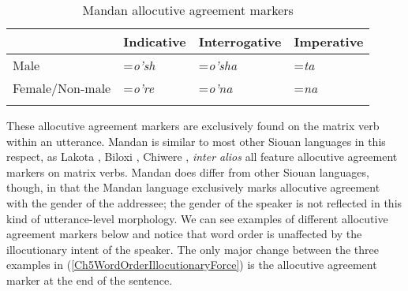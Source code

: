 \begin{table}
\caption{Mandan allocutive agreement markers} 
\label{allocutivetable2}

	\begin{tabular}{llll}
	\lsptoprule
		~		&
			Indicative		&
			Interrogative	&	
			Imperative\\
			\midrule
		Male	&	
			=\textit{o'sh}	&	
			=\textit{o'sha}	&	
			=\textit{ta}\\
		Female/Non-male	&	
			=\textit{o're}	&	
			=\textit{o'na}	&	
			=\textit{na}\\
			\lspbottomrule
		\end{tabular}

\end{table}

These allocutive agreement markers are exclusively found on the matrix verb within an utterance. Mandan is similar to most other Siouan languages in this respect, as Lakota \citep{trechter1995}, Biloxi \citep{dorseyswanton1912}, Chiwere \citep{greer2016}, \textit{inter alios} all feature allocutive agreement markers on matrix verbs. Mandan does differ from other Siouan languages, though, in that the Mandan language exclusively marks allocutive agreement with the gender of the addressee; the gender of the speaker is not reflected in this kind of utterance-level morphology. We can see examples of different allocutive agreement markers below and notice that word order is unaffected by the illocutionary intent of the speaker. The only major change between the three examples in (\ref{Ch5WordOrderIllocutionaryForce}) is the allocutive agreement marker at the end of the sentence.

